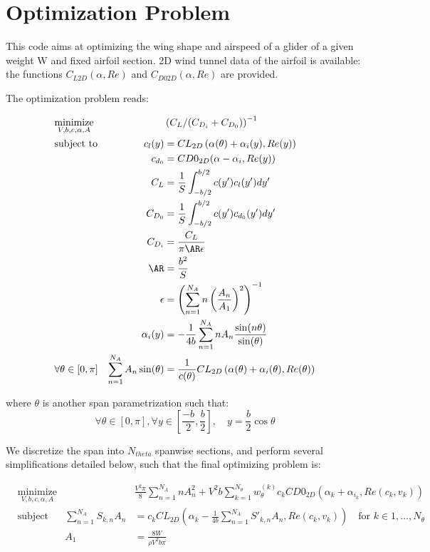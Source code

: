 \documentclass[letterpaper,12pt]{article}
\begin{document}
\section{Optimization Problem}

This code aims at optimizing the wing shape and airspeed of a glider of a given weight W and fixed airfoil section.
2D wind tunnel data of the airfoil is available: the functions
$C_{L2D}(\alpha, Re)$ and 
$C_{D02D}(\alpha, Re)$ are provided.

The optimization problem reads:

\begin{align*}
	& \underset{V, b, c, \alpha, A}{\text{minimize}}
	& & \left( C_L / (C_{D_i} + C_{D_0})\right)^{-1} \nonumber \\
	& \text{subject to} 
	&   c_l(y) &= CL_{2D} \left( \alpha(\theta) + \alpha_i(y), Re(y)\right) \\
	& & c_{d_0} &= CD0_{2D}(\alpha - \alpha_i, Re(y)) \\
	& & C_L &= \frac 1 S \int_{-b/2}^{b/2} c(y') c_l(y') dy'\\
	& & C_{D_0} &= \frac 1 S \int_{-b/2}^{b/2} c(y') c_{d_0}(y') dy'\\
	& & C_{D_i} & = \frac{C_L}{\pi \AR \epsilon} \\
	& & \AR &= \frac{b^2}{S} \\
	& & \epsilon &= \left(\sum_{n=1}^{N_A} n \left(\frac{A_n}{A_1}\right)^2 \right)^{-1} \\
	& & \alpha_i(y) &= -\frac 1 {4b} \sum_{n=1}^{N_A} n A_n\frac{\sin(n\theta)}{\sin(\theta)} \\
	& \forall \theta \in [0, \pi] & \sum_{n=1}^{N_A} A_n \sin(\theta) &= \frac{1}{c(\theta)} CL_{2D} \left( \alpha(\theta) + \alpha_i(\theta), Re(\theta)\right) \\
\end{align*}

where $\theta$ is another span parametrization such that:
$$\forall \theta \in [0,\pi], \forall y \in [\frac {-b} 2, \frac b 2], \quad y = \frac b 2 \cos\theta$$

We discretize the span into $N_{theta}$ spanwise sections, and perform several simplifications detailed below, such that the final optimizing problem is:

\begin{align*}
	& \underset{V, b, c, \alpha, A}{\text{minimize}}
	& & \frac{V^2 \pi}{8}\sum_{n=1}^{N_A} n A_{n}^2 +
	  V^2 b  \sum_{k=1}^{N_{\theta}} w_{\theta}^{(k)} c_k CD0_{2D}\left( 
		\alpha_k +\alpha_{i_k}, Re(c_k, v_k)
		\right) \\
	& \text{subject to}
	&  \sum_{n=1}^{N_{A}} S_{k,n} A_n &=  c_kCL_{2D} \left( \alpha_k - \frac {1}{4b} 
		\sum_{n=1}^{N_{A}}S'_{k,n}A_n , Re(c_k, v_k)\right) \quad \text{for } k \in 1,\dots, N_{\theta} \\
	& &  A_1 &= \frac{8W}{\rho V^2 b \pi}\\
\end{align*}
\end{document}
